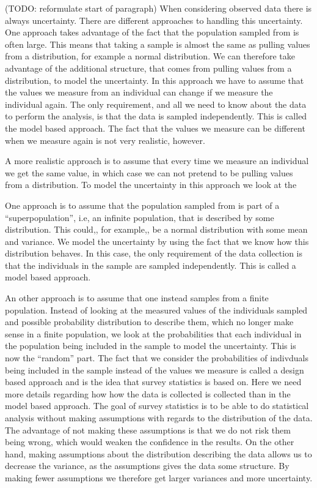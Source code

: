 \documentclass{article}
\begin{document}
(TODO: reformulate start of paragraph) When considering observed data there is always uncertainty. There are different
approaches to handling this uncertainty. One approach takes advantage of the fact that the
population sampled from is often large. This means that taking a sample is
almost the same as pulling values from a distribution, for example a normal distribution. We can therefore
take advantage of the additional structure, that comes from pulling values from a
distribution, to model the uncertainty. In this approach we have to assume that
the values we measure from an individual can change if we measure the individual
again. The only requirement, and all we need to know about the data to perform
the analysis, is that the data is sampled independently. This is called the
model based approach. The fact that the
values we measure can be different when we measure again is not very realistic,
however.

A more realistic approach is to assume that every time we measure an
individual we get the same value, in which case we can not pretend to be pulling
values from a distribution. To model the uncertainty in this approach we look at the


One approach is to assume that the population sampled from is part of a ``superpopulation'', i.e, an
infinite population, that is described by some distribution. This could,, for example,, be a
normal distribution with some mean and variance. We model the uncertainty by using the
fact that we know how this distribution behaves.
In this case, the only requirement of the data collection is that the
individuals in the sample are sampled independently. This is called a model based approach.


An other approach is to assume that one instead samples from a finite
population. Instead of looking at the measured values of the individuals sampled and
possible probability distribution to describe them, which no longer make sense
in a finite population, we look at the probabilities that
each individual in the population being included in the sample to model the uncertainty. This is now the
``random'' part.
The fact that we consider the probabilities of indivduals being included in the
sample instead of the values we measure is called a design based approach and is
the idea that survey statistics is based on. Here we need more details regarding
how how the data is collected is collected than in the model based approach.
The goal of survey statistics is to be able to do statistical analysis without
making assumptions with regards to the distribution of the data. The advantage
of not making these assumptions is that we do not risk them being wrong, which
would weaken the confidence in the results. On the other hand,
making assumptions about the distribution describing the data allows us to decrease the variance, as the assumptions
gives the data some structure. By making fewer assumptions we
therefore get larger variances and more uncertainty.
\end{document}
